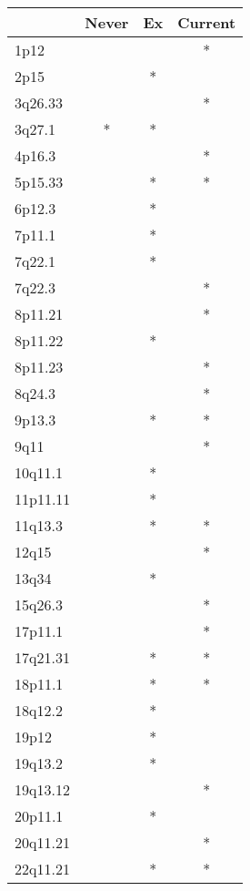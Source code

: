 \begin{tabular}{lccc}
\toprule
{} & Never & Ex & Current \\
\midrule
1p12     &       &    &       * \\
2p15     &       &  * &         \\
3q26.33  &       &    &       * \\
3q27.1   &     * &  * &         \\
4p16.3   &       &    &       * \\
5p15.33  &       &  * &       * \\
6p12.3   &       &  * &         \\
7p11.1   &       &  * &         \\
7q22.1   &       &  * &         \\
7q22.3   &       &    &       * \\
8p11.21  &       &    &       * \\
8p11.22  &       &  * &         \\
8p11.23  &       &    &       * \\
8q24.3   &       &    &       * \\
9p13.3   &       &  * &       * \\
9q11     &       &    &       * \\
10q11.1  &       &  * &         \\
11p11.11 &       &  * &         \\
11q13.3  &       &  * &       * \\
12q15    &       &    &       * \\
13q34    &       &  * &         \\
15q26.3  &       &    &       * \\
17p11.1  &       &    &       * \\
17q21.31 &       &  * &       * \\
18p11.1  &       &  * &       * \\
18q12.2  &       &  * &         \\
19p12    &       &  * &         \\
19q13.2  &       &  * &         \\
19q13.12 &       &    &       * \\
20p11.1  &       &  * &         \\
20q11.21 &       &    &       * \\
22q11.21 &       &  * &       * \\
\bottomrule
\end{tabular}
